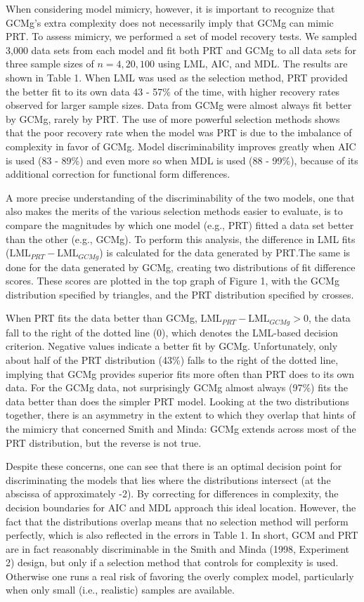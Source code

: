 \documentclass[11pt]{article}
\begin{document}
When considering model mimicry, however, it is important to recognize that GCMg's extra complexity
does not necessarily imply that GCMg can mimic PRT. To assess mimicry, we performed a set of model
recovery tests. We sampled 3,000 data sets from each model and fit both PRT and GCMg to all data
sets for three sample sizes of $n = 4, 20, 100$ using LML, AIC, and MDL. The results are shown
in Table 1. When LML was used as the selection method, PRT provided the better fit to its own data
43 - 57\% of the time, with higher recovery rates observed for larger sample sizes. Data from GCMg
were almost always fit better by GCMg, rarely by PRT. The use of more powerful selection methods
shows that the poor recovery rate when the model was PRT is due to the imbalance of complexity in
favor of GCMg.  Model discriminability improves greatly when AIC is used (83 - 89\%) and even more
so when MDL is used (88 - 99\%), because of its additional correction for functional form
differences.


A more precise understanding of the discriminability of the two models, one that also makes the
merits of the various selection methods easier to evaluate, is to compare the magnitudes by which
one model (e.g., PRT) fitted a data set better than the other (e.g., GCMg). To perform this
analysis, the difference in LML fits ($\mbox{LML}_{PRT} - \mbox{LML}_{GCMg}$) is calculated for
the data generated by PRT.\footnotemark[7] The same is done for the data generated by GCMg,
creating two distributions of fit difference scores. These scores are plotted in the top graph of
Figure 1, with the GCMg distribution specified by triangles, and the PRT distribution specified by
crosses.


When PRT fits the data better than GCMg, $\mbox{LML}_{PRT} - \mbox{LML}_{GCMg} > 0$, the data
fall to the right of the dotted line (0), which denotes the LML-based decision criterion. Negative
values indicate a better fit by GCMg. Unfortunately, only about half of the PRT distribution
(43\%) falls to the right of the dotted line, implying that GCMg provides superior fits more often
than PRT does to its own data. For the GCMg data, not surprisingly GCMg almost always (97\%) fits
the data better than does the simpler PRT model. Looking at the two distributions together, there
is an asymmetry in the extent to which they overlap that hints of the mimicry that concerned Smith
and Minda: GCMg extends across most of the PRT distribution, but the reverse is not true.


Despite these concerns, one can see that there is an optimal decision point for discriminating the
models that lies where the distributions intersect (at the abscissa of approximately -2). By
correcting for differences in complexity, the decision boundaries for AIC and MDL approach this
ideal location. However, the fact that the distributions overlap means that no selection method
will perform perfectly, which is also reflected in the errors in Table 1. In short, GCM and PRT
are in fact reasonably discriminable in the Smith and Minda (1998, Experiment 2) design, but only
if a selection method that controls for complexity is used. Otherwise one runs a real risk of
favoring the overly complex model, particularly when only small (i.e., realistic) samples are
available.
\end{document}
